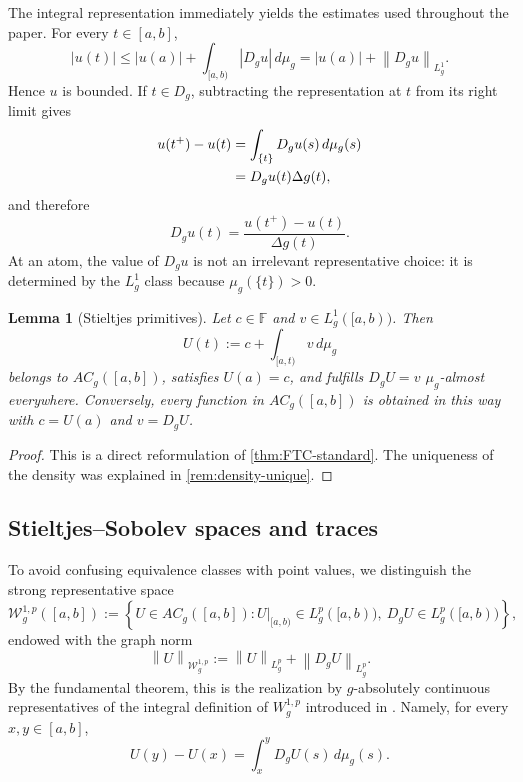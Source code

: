 \documentclass[preprint,12pt]{elsarticle}
\newtheorem{lemma}[theorem]{Lemma}
\theoremstyle{definition}
\theoremstyle{remark}
\newcommand{\F}{\mathbb F}
\newcommand{\norm}[1]{\left\lVert#1\right\rVert}
\newcommand{\abs}[1]{\left\lvert#1\right\rvert}
\begin{document}
The integral representation immediately yields the estimates used throughout the paper. For every $t\in[a,b]$,
\begin{equation}\label{eq:bounded-AC}
 \abs{u(t)}
 \le \abs{u(a)}+\int_{[a,b)}\abs{D_gu}\,d\mu_g
 =\abs{u(a)}+\norm{D_gu}_{L_g^1}.
\end{equation}
Hence $u$ is bounded. If $t\in D_g$, subtracting the representation at $t$ from its right limit gives
\begin{align}
 u(t^+)-u(t)
 &=\int_{\{t\}}D_gu(s)\,d\mu_g(s)\notag\\
 &=D_gu(t)\Delta g(t),\label{eq:jump-strong}
\end{align}
and therefore
\begin{equation}\label{eq:Dg-atom}
 D_gu(t)=\frac{u(t^+)-u(t)}{\Delta g(t)}.
\end{equation}
At an atom, the value of $D_gu$ is not an irrelevant representative choice: it is determined by the $L_g^1$ class because $\mu_g(\{t\})>0$.

\begin{lemma}[Stieltjes primitives]\label{lem:FTC}
Let $c\in\F$ and $v\in L_g^1([a,b))$. Then
\[
 U(t):=c+\int_{[a,t)}v\,d\mu_g
\]
belongs to $AC_g([a,b])$, satisfies $U(a)=c$, and fulfills $D_gU=v$ $\mu_g$-almost everywhere. Conversely, every function in $AC_g([a,b])$ is obtained in this way with $c=U(a)$ and $v=D_gU$.
\end{lemma}

\begin{proof}
This is a direct reformulation of \cref{thm:FTC-standard}. The uniqueness of the density was explained in \cref{rem:density-unique}.
\end{proof}

\subsection{Stieltjes--Sobolev spaces and traces}

To avoid confusing equivalence classes with point values, we distinguish the strong representative space
\begin{equation}\label{eq:Wgp-strong}
 \mathcal W_g^{1,p}([a,b])
 :=\left\{U\in AC_g([a,b]):
 U|_{[a,b)}\in L_g^p([a,b)),\ D_gU\in L_g^p([a,b))\right\},
\end{equation}
endowed with the graph norm
\begin{equation}\label{eq:Wgp-norm}
 \norm{U}_{\mathcal W_g^{1,p}}
 :=\norm{U}_{L_g^p}+\norm{D_gU}_{L_g^p}.
\end{equation}
By the fundamental theorem, this is the realization by $g$-absolutely continuous representatives of the integral definition of $W_g^{1,p}$ introduced in \cite{FerToVil24}. Namely, for every $x,y\in[a,b]$,
\[
 U(y)-U(x)=\int_x^yD_gU(s)\,d\mu_g(s).
\]
\end{document}
